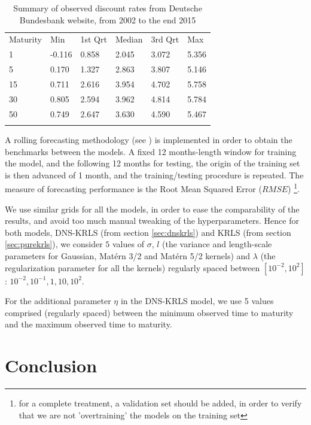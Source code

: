 \begin{table}
\begin{center}
\caption{Summary of observed discount rates from Deutsche Bundesbank website, from 2002 to the end 2015}
\label{tab:summary_db_zeros}       %
\begin{tabular}{llllll}
\hline\noalign{\smallskip}
Maturity & Min & 1st Qrt  & Median  & 3rd Qrt  & Max  \\
\noalign{\smallskip}\hline\noalign{\smallskip}
  1 & -0.116 & 0.858 & 2.045 & 3.072 & 5.356 \\
  5 & 0.170 & 1.327 & 2.863 & 3.807 & 5.146\\
  15 & 0.711 & 2.616 & 3.954 & 4.702 & 5.758\\
  30 & 0.805 & 2.594 & 3.962 & 4.814 & 5.784\\
  50 & 0.749 & 2.647 & 3.630 & 4.590 & 5.467\\
\noalign{\smallskip}\hline
\end{tabular}
\end{center}
\end{table}

A rolling forecasting methodology (see \cite{bergmeir2015note}) is implemented in order to obtain the benchmarks between the models. A fixed 12 months-length window for training the model, and the following 12 months for testing, the origin of the training set is then advanced of 1 month, and the training/testing procedure is repeated. The measure of forecasting performance is the Root Mean Squared Error ($RMSE$) \footnote{for a complete treatment, a validation set should be added, in order to verify that we are not 'overtraining' the models on the training set}.

\newpage

We use similar grids for all the models, in order to ease the comparability of the results, and avoid too much manual tweaking of the hyperparameters. Hence for both models, DNS-KRLS (from section \ref{sec:dnskrls}) and KRLS (from section \ref{sec:purekrls}), we consider $5$ values of $\sigma$, $l$ (the variance and length-scale parameters for Gaussian, Mat\'ern 3/2 and Mat\'ern 5/2 kernels) and $\lambda$ (the regularization parameter for all the kernels) regularly spaced between $\left[ 10^{-2}, 10^2\right]$: $10^{-2}, 10^{-1}, 1, 10, 10^{2}$. 

\medskip

For the additional parameter $\eta$ in the DNS-KRLS model, we use 5 values comprised (regularly spaced) between the minimum observed time to maturity and the maximum observed time to maturity.



\section{Conclusion}

\newpage

\nocite{wickham2016ggplot2}

